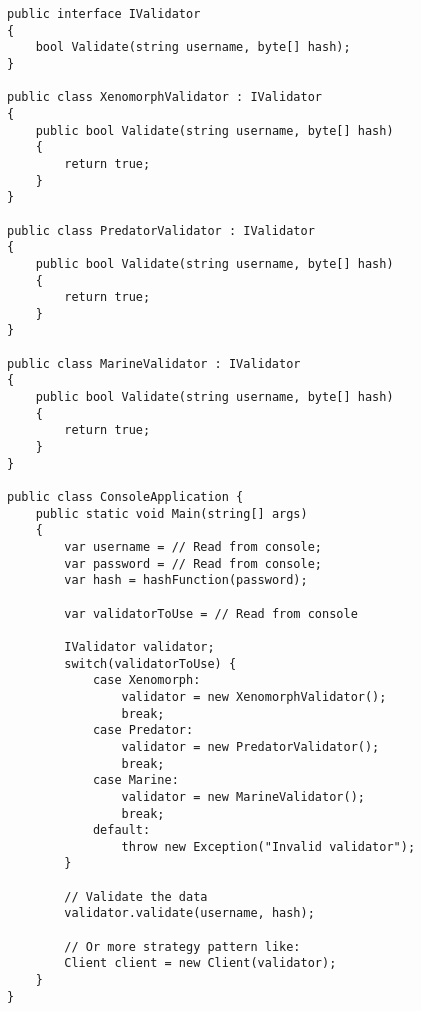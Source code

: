 \begin{lstlisting}
public interface IValidator
{
    bool Validate(string username, byte[] hash);
}

public class XenomorphValidator : IValidator
{
    public bool Validate(string username, byte[] hash)
    {
        return true;
    }
}

public class PredatorValidator : IValidator
{
    public bool Validate(string username, byte[] hash)
    {
        return true;
    }
}

public class MarineValidator : IValidator
{
    public bool Validate(string username, byte[] hash)
    {
        return true;
    }
}

public class ConsoleApplication {
    public static void Main(string[] args)
    {
        var username = // Read from console;
        var password = // Read from console;
        var hash = hashFunction(password);

        var validatorToUse = // Read from console

        IValidator validator;
        switch(validatorToUse) {
            case Xenomorph:
                validator = new XenomorphValidator();
                break;
            case Predator:
                validator = new PredatorValidator();
                break;
            case Marine:
                validator = new MarineValidator();
                break;
            default:
                throw new Exception("Invalid validator");
        }

        // Validate the data
        validator.validate(username, hash);

        // Or more strategy pattern like:
        Client client = new Client(validator);
    }
}
\end{lstlisting}